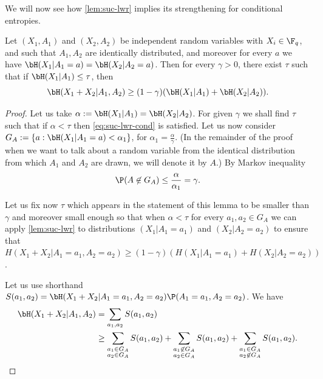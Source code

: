 \documentclass[11pt]{article}
\begin{document}
We will now see how \cref{lem:suc-lwr} implies its strengthening for conditional entropies.
\begin{lemma}
	\label{lem:suc-lwr-sum}
	Let $(X_1, A_1)$ and $(X_2, A_2)$ be independent random variables with $X_i \in \F_q$, and such that $A_1, A_2$ are identically distributed, and moreover for every $a$ we have $\bH(X_1 | A_1 = a) = \bH(X_2 | A_2 = a)$. Then for every $\gamma > 0$, there exist $\tau$ such that if $\bH(X_1 |A_1) \leq \tau$, then
	\begin{equation}
		\bH(X_1 + X_2 | A_1, A_2) \geq (1 - \gamma)(\bH(X_1|A_1) + \bH(X_2|A_2)).
		\label{eq:suc-lwr-cond}
	\end{equation}
\end{lemma}
\begin{proof}
	Let us take $\alpha := \bH(X_1|A_1) = \bH(X_2|A_2)$. For given $\gamma$ we shall find $\tau$ such that if $\alpha < \tau$ then \cref{eq:suc-lwr-cond} is satisfied.  Let us now consider $G_A := \{ a : \bH(X_1 | A_1 = a) < \alpha_1 \}$, for $\alpha_1 = \frac{\alpha}{\gamma}$.
	(In the remainder of the proof when we want to talk about a random variable from the identical distribution from which $A_1$ and $A_2$ are drawn, we will denote it by $A$.) By Markov inequality
	\begin{equation*}
		\P(A \not\in G_A) \leq \frac{\alpha}{\alpha_1} = \gamma.
	\end{equation*}
	
	Let us fix now $\tau$ which appears in the statement of this lemma to be smaller than $\gamma$
	and moreover small enough so that when $\alpha < \tau$ for every $a_1, a_2 \in G_A$ we can apply \cref{lem:suc-lwr} to distributions $(X_1 | A_1 = a_1)$ and $(X_2 | A_2 = a_2)$ to ensure
	that $H(X_1 + X_2 | A_1 = a_1, A_2 = a_2) \geq (1 - \gamma)(H(X_1 | A_1 = a_1) + H(X_2 | A_2 = a_2))$.
	
	Let us use shorthand $S(a_1, a_2) = \bH(X_1 + X_2 | A_1 = a_1, A_2 = a_2) \P(A_1 = a_1, A_2 = a_2)$. We have
	\begin{align}
		\bH(X_1 + X_2 | A_1, A_2) & = \sum_{a_1, a_2} S(a_1, a_2) \nonumber \\
		& \geq \sum_{\substack{a_1 \in G_A\\ a_2 \in G_A}} S(a_1, a_2) + \sum_{\substack{a_1 \not\in G_A \\ a_2\in G_A}} S(a_1, a_2) + \sum_{\substack{a_1\in G_A\\ a_2 \not\in G_A}} S(a_1, a_2).
		\label{eq:three-terms}
	\end{align}
	

\end{proof}
\end{document}
